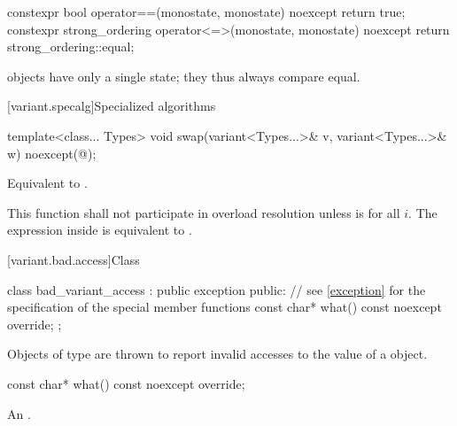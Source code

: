 %
%
\begin{itemdecl}
constexpr bool operator==(monostate, monostate) noexcept { return true; }
constexpr strong_ordering operator<=>(monostate, monostate) noexcept
{ return strong_ordering::equal; }
\end{itemdecl}

\begin{itemdescr}
\pnum
\begin{note}
 objects have only a single state; they thus always compare equal.
\end{note}
\end{itemdescr}

[variant.specalg]{Specialized algorithms}

%
\begin{itemdecl}
template<class... Types>
  void swap(variant<Types...>& v, variant<Types...>& w) noexcept(@\seebelow@);
\end{itemdecl}

\begin{itemdescr}
\pnum
\effects
Equivalent to .

\pnum
\remarks
This function shall not participate in overload resolution
unless 
is  for all $i$.
The expression inside  is equivalent to .
\end{itemdescr}

%
[variant.bad.access]{Class }

\begin{codeblock}
class bad_variant_access : public exception {
public:
  // see \ref{exception} for the specification of the special member functions
  const char* what() const noexcept override;
};
\end{codeblock}

\pnum
Objects of type  are thrown to report invalid
accesses to the value of a  object.

%
\begin{itemdecl}
const char* what() const noexcept override;
\end{itemdecl}

\begin{itemdescr}
\pnum
\returns
An  \ntbs{}.
\end{itemdescr}


